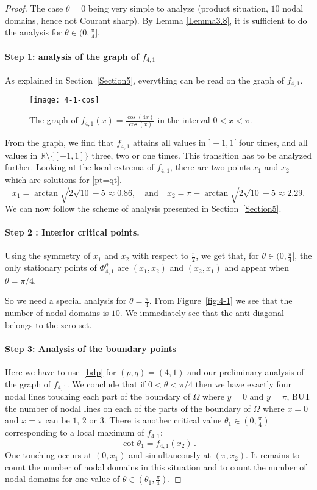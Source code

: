\documentclass[a4paper,reqno,11pt]{amsart}
\theoremstyle{remark}
\theoremstyle{definition}
\numberwithin{equation}{section}
\begin{document}
\begin{proof}
The case $\theta=0$ being very simple to analyze (product situation, $10$ 
nodal domains, hence not Courant sharp). By Lemma \ref{Lemma3.8},  it 
is sufficient to do the analysis for $\theta \in (0,\frac \pi 4]$. 

\paragraph{\bfseries Step 1: analysis of the graph of $f_{4,1}$}
As explained in Section~\ref{Section5}, everything can be read on the graph 
of $f_{4,1}$.
\begin{figure}[ht]
\centering
\texttt{[image: 4-1-cos]}
\caption{The graph of $f_{4,1}(x)=\frac{\cos(4x)}{\cos(x)}$ in the interval 
$0<x<\pi$.}
\label{fig:4-1-cos}
\end{figure}
From the graph, we find that $f_{4,1}$ attains all values in $]-1,1[$ 
four times,  and  all values in $\mathbb{R}\setminus\{[-1,1]\}$ three, two 
or one times. This transition has to be analyzed further. Looking at the 
local extrema of $f_{4,1}$, there are two points $x_1$ and $x_2$ which 
are  solutions for \eqref{pt=qt}.
\[
x_1=\arctan\sqrt{2\sqrt{10}-5}\approx 0.86,\quad \text{and}\quad x_2 
= \pi-\arctan\sqrt{2\sqrt{10}-5}\approx 2.29.
\]
We can now follow the scheme of analysis presented in Section~\ref{Section5}.

\paragraph{\bfseries Step 2 : Interior critical points.}
Using the symmetry of $x_1$ and $x_2$ with respect to $\frac \pi 2$, we 
get that, for $\theta \in (0,\frac \pi 4]$, the only  stationary points 
of $\Phi_{4,1}^\theta$ are $(x_1,x_2)$ and $(x_2,x_1)$  and appear 
when $\theta=\pi/4$.

So we need a special analysis for $\theta =\frac \pi 4$. From 
Figure~\ref{fig:4-1} we see that the number of nodal domains is $10$.
We immediately see that the anti-diagonal belongs to the zero set.

\paragraph{\bfseries Step 3: Analysis of the boundary points}
Here we have to use~\eqref{bdp} for $(p,q)=(4,1)$ and our preliminary 
analysis of the graph of $f_{4,1}$.
We conclude that if $0<\theta<\pi/4$ then we have exactly
four nodal lines touching each part of the boundary of $\Omega$ where $y=0$ 
and $y=\pi$,  BUT  the number of  nodal lines on each of the parts of 
the boundary of $\Omega$ where $x=0$ and $x=\pi$ can be $1$, $2$ or $3$. 
There is another critical value $\theta_1 \in (0,\frac \pi 4)$ corresponding 
to a local maximum of $f_{4,1}$:
\[
\cot \theta_1 = f_{4,1} (x_2)\,.
\]
One touching occurs at $(0,x_1)$ and simultaneously at $(\pi, x_2)$.
It remains to count the number of nodal domains in this situation and to 
count the number of nodal domains for one value of 
$\theta \in (\theta_1,\frac \pi 4)$.


\end{proof}
\end{document}
